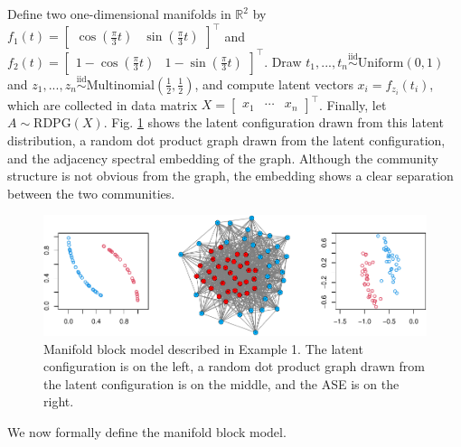 \documentclass[12pt]{article}
\begin{document}
\begin{example}
Define two one-dimensional manifolds in $\mathbb{R}^2$ by $f_1(t) = \begin{bmatrix} \cos(\frac{\pi}{3} t) & \sin(\frac{\pi}{3} t) \end{bmatrix}^\top$ and $f_2(t) = \begin{bmatrix} 1 - \cos(\frac{\pi}{3} t) & 1 - \sin(\frac{\pi}{3} t) \end{bmatrix}^\top$.
Draw $t_1, ..., t_n \stackrel{\mathrm{iid}}{\sim}\mathrm{Uniform}(0, 1)$ and $z_1, ..., z_n \stackrel{\mathrm{iid}}{\sim}\mathrm{Multinomial}(\frac{1}{2}, \frac{1}{2})$, and compute latent vectors $x_i = f_{z_i}(t_i)$, which are collected in data matrix $X = \begin{bmatrix} x_1 & \cdots & x_n \end{bmatrix}^\top$. 
Finally, let $A \sim \mathrm{RDPG}(X)$. Fig. \ref{fig:example1} shows the latent configuration drawn from this latent distribution, a random dot product graph drawn from the latent configuration, and the adjacency spectral embedding of the graph. 
Although the community structure is not obvious from the graph, the embedding shows a clear separation between the two communities. 

\begin{figure}[H]

{\centering \includegraphics{draft_files/figure-latex/example1-1} 

}

\caption{Manifold block model described in Example 1. The latent configuration is on the left, a random dot product graph drawn from the latent configuration is on the middle, and the ASE is on the right.}\label{fig:example1}
\end{figure}
\end{example}

We now formally define the manifold block model.
\end{document}
